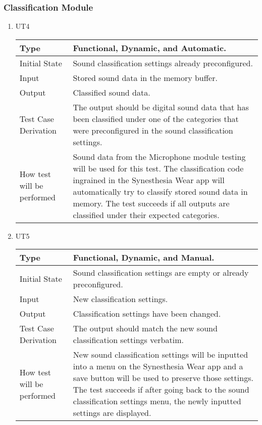 \documentclass[12pt, titlepage]{article}
\begin{document}
\subsubsection{Classification Module}

\begin{enumerate}

\item{UT4\\}

\begin{tabular}{ |p{5cm}||p{7cm}| }
    \hline
    Type & Functional, Dynamic, and Automatic. \\
    \hline
    Initial State  &  Sound classification settings already preconfigured.\\
    \hline
    Input &   Stored sound data in the memory buffer.  \\
    \hline
    Output &   Classified sound data.  \\
    \hline
    Test Case Derivation &   The output should be digital sound data that has been classified under one of the categories that were preconfigured in the sound classification settings.\\
    \hline
    How test will be performed & Sound data from the Microphone module testing will be used for this test. The classification code ingrained in the Synesthesia Wear app will automatically try to classify stored sound data in memory. The test succeeds if all outputs are classified under their expected categories.\\
    \hline
\end{tabular}

\item{UT5\\}

\begin{tabular}{ |p{5cm}||p{7cm}| }
    \hline
    Type & Functional, Dynamic, and Manual. \\
    \hline
    Initial State  &  Sound classification settings are empty or already preconfigured. \\
    \hline
    Input &   New classification settings.  \\
    \hline
    Output &   Classification settings have been changed.  \\
    \hline
    Test Case Derivation &   The output should match the new sound classification settings verbatim.\\
    \hline
    How test will be performed & New sound classification settings will be inputted into a menu on the Synesthesia Wear app and a save button will be used to preserve those settings. The test succeeds if after going back to the sound classification settings menu, the newly inputted settings are displayed.\\
    \hline
\end{tabular}

\end{enumerate}
\end{document}
